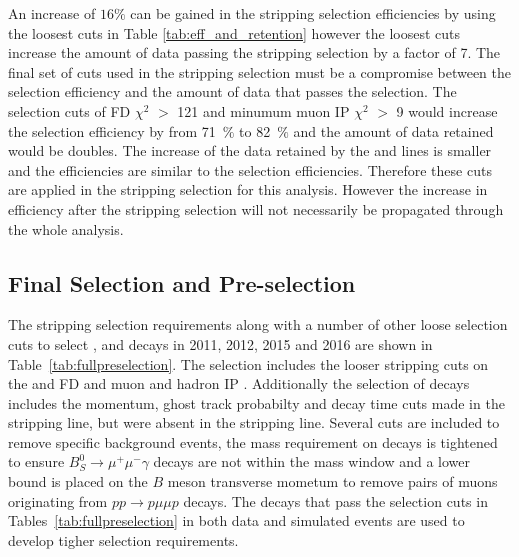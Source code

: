 An increase of $16\%$ can be gained in the stripping selection efficiencies by using the loosest cuts in Table \ref{tab:eff_and_retention} however the loosest cuts increase the amount of data passing the \bmumu stripping selection by a factor of 7. The final set of cuts used in the stripping selection must be a compromise between the selection efficiency and the amount of data that passes the selection. The selection cuts of \bs FD $\chi^{2}$ $>$ 121 and minumum muon IP $\chi^{2}$ $>$ 9 would increase the \bmumu selection efficiency by from 71~$\%$ to 82~$\%$ and the amount of data retained would be doubles. The increase of the data retained by the \bhh and \bujpsik lines is smaller and the efficiencies are similar to the \bmumu selection efficiencies. Therefore these cuts are applied in the stripping selection for this analysis. However the increase in efficiency after the stripping selection will not necessarily be propagated through the whole analysis. 



\subsection{Final Selection and Pre-selection}
\label{finalloosesel}
The stripping selection requirements along with a number of other loose selection cuts to select \bmumu, \bhh and \bujpsik decays in 2011, 2012, 2015 and 2016 are shown in Table~\ref{tab:fullpreselection}. The selection includes the looser stripping cuts on the \bsd and \jpsi FD \chisqd and muon and hadron IP \chisqd. Additionally the selection of \bmumu decays includes the momentum, ghost track probabilty and decay time cuts made in the \bhh stripping line, but were absent in the \bmumu stripping line. Several cuts are included to remove specific background events, the mass requirement on \bmumu decays is tightened to ensure $B_{S}^{0}\to\mu^{+}\mu^{-}\gamma$ decays are not within the mass window and a lower bound is placed on the $B$ meson transverse mometum to remove pairs of muons originating from $pp \to p\mu\mu p$ decays. %
The decays that pass the selection cuts in Tables~\ref{tab:fullpreselection} in both data and simulated events are used to develop tigher selection requirements. 


